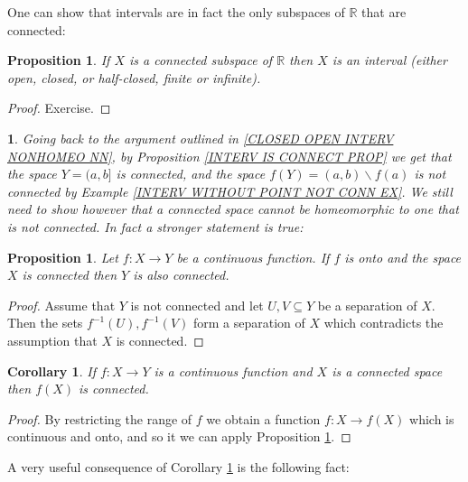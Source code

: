 \documentclass[11pt, letterpaper, oneside]{report}
\theoremstyle{pplain}
\newtheorem{proposition}[theorem]{Proposition}
\newtheorem{corollary}[theorem]{Corollary}
\newtheorem{ITERMVALUE THM}[theorem]{Intermediate Value Theorem}
\newtheorem{HEINEBOREL THM}[theorem]{Heine-Borel Theorem}
\newtheorem{UMETR THM}[theorem]{Urysohn Metrization Theorem}
\newtheorem{UMETR2 THM}[theorem]{Urysohn Metrization Theorem (v.2)}
\theoremstyle{ddefinition}
\theoremstyle{nnn}
\newtheorem{nn}[theorem]{}
\newtheorem{TDA NN}[theorem]{Topological Data Analysis. }
\theoremstyle{eexercise}
\newcommand{\R}{{\mathbb R}}
\newcommand{\ssmin}{\smallsetminus}
\begin{document}
One can show that intervals are in fact the only subspaces of $\R$ that are connected:

\begin{proposition}
\label{CONN SUBSPACES OF R PROP}
If $X$ is a connected subspace of $\R$ then $X$ is an interval (either open, closed, or half-closed, finite or
infinite). 
\end{proposition}

\begin{proof}
Exercise. 
\end{proof}


\begin{nn}
Going back to the argument outlined in \ref{CLOSED OPEN INTERV NONHOMEO NN}, by Proposition \ref{INTERV IS CONNECT PROP} we get that the space $Y = (a, b]$ is connected, and 
the space $f(Y) = (a, b) \ssmin f(a)$ is not connected by Example 
\ref{INTERV WITHOUT POINT NOT CONN EX}.  We still need to show however  
that a connected space cannot be homeomorphic to  one that is not connected. In fact a stronger statement 
is true:
\end{nn}


\begin{proposition}
\label{CONN ONTO  MAP PROP}
Let $f\colon X\to Y$ be a continuous function. If $f$ is onto and  the space $X$ is connected 
then $Y$ is also connected. 
\end{proposition}

\begin{proof}
Assume that $Y$ is not connected and let $U, V\subseteq Y$  be a separation of $X$. 
Then the sets $f^{-1}(U), f^{-1}(V)$ form a separation of $X$ which 
contradicts the assumption that $X$ is connected. 
\end{proof}


\begin{corollary}
\label{CONN IMAGE COR}
If $f\colon X\to Y$ is a continuous function and $X$ is a connected space then $f(X)$ is connected. 
\end{corollary}

\begin{proof}
By restricting the range of  $f$ we obtain a function 
$f\colon X \to f(X)$ which is continuous and onto, and so it we can apply
Proposition \ref{CONN ONTO  MAP PROP}. 
\end{proof}

A very useful consequence of Corollary \ref{CONN IMAGE COR} is the following fact:
\end{document}
